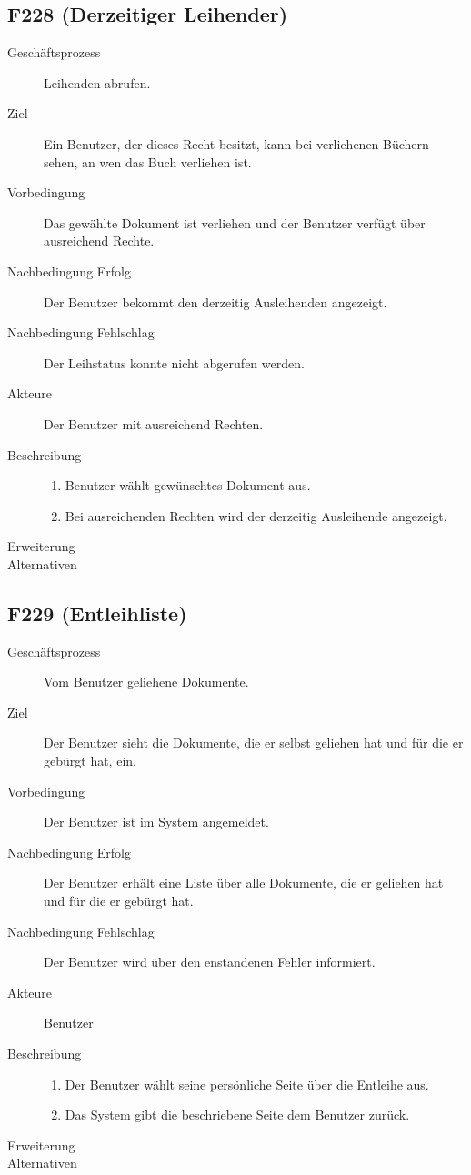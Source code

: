 \subsection{F228 (Derzeitiger Leihender)}    %
\begin{description}
  \item[Geschäftsprozess]Leihenden abrufen.
  \item[Ziel]Ein Benutzer, der dieses Recht besitzt, kann bei verliehenen Büchern sehen, an wen das Buch verliehen ist.
  \item[Vorbedingung]Das gewählte Dokument ist verliehen und der Benutzer verfügt über ausreichend Rechte.
  \item[Nachbedingung Erfolg]Der Benutzer bekommt den derzeitig Ausleihenden angezeigt.
  \item[Nachbedingung Fehlschlag]Der Leihstatus konnte nicht abgerufen werden.
  \item[Akteure]Der Benutzer mit ausreichend Rechten.
  \item[Beschreibung]\hfill
  \begin{enumerate}
  \item Benutzer wählt gewünschtes Dokument aus.
  \item Bei ausreichenden Rechten wird der derzeitig Ausleihende angezeigt.
  \end{enumerate}
  \item[Erweiterung]
  \item[Alternativen]
\end{description}

\subsection{F229 (Entleihliste)}
\begin{description}
  \item[Geschäftsprozess]Vom Benutzer geliehene Dokumente.
  \item[Ziel]Der Benutzer sieht die Dokumente, die er selbst geliehen hat und für die er gebürgt hat, ein.
  \item[Vorbedingung]Der Benutzer ist im System angemeldet.
  \item[Nachbedingung Erfolg]Der Benutzer erhält eine Liste über alle Dokumente, die er geliehen hat und für die er gebürgt hat.
  \item[Nachbedingung Fehlschlag]Der Benutzer wird über den enstandenen Fehler informiert.
  \item[Akteure]Benutzer
  \item[Beschreibung]\hfill
    \begin{enumerate}
      \item Der Benutzer wählt seine persönliche Seite über die Entleihe aus.
      \item Das System gibt die beschriebene Seite dem Benutzer zurück.
    \end{enumerate}
  \item[Erweiterung]
  \item[Alternativen]
\end{description}

